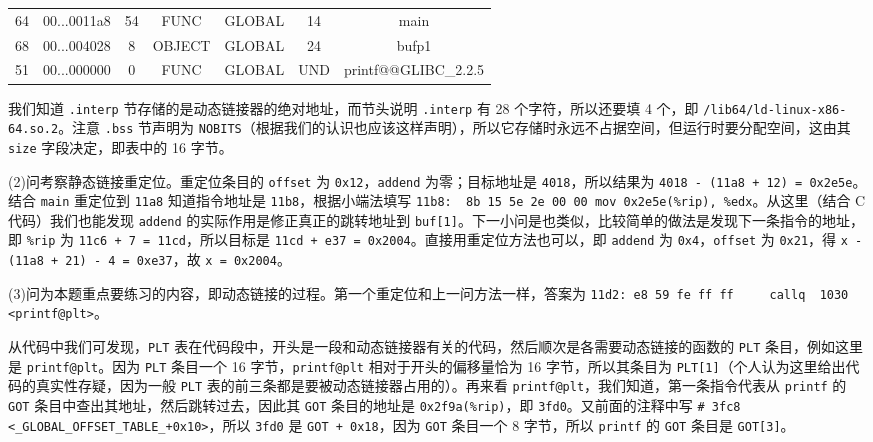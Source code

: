 \begin{problems}
\begin{table}[H]
\begin{tabular}{ccccccc}
                \multicolumn{1}{|c}{64} & 00...0011a8 & 54 & FUNC & GLOBAL & 14 & \multicolumn{1}{c|}{main} \\
                \multicolumn{1}{|c}{68} & 00...004028 & 8 & OBJECT & GLOBAL & 24 & \multicolumn{1}{c|}{bufp1} \\
                \multicolumn{1}{|c}{51} & 00...000000 & 0 & FUNC & GLOBAL & UND & \multicolumn{1}{c|}{printf@@GLIBC\_2.2.5} \\ \hline
            \end{tabular}
        \end{table}

        我们知道 \verb|.interp| 节存储的是动态链接器的绝对地址，而节头说明 \verb|.interp| 有 28 个字符，所以还要填 4 个，即 \verb|/lib64/ld-linux-x86-64.so.2|。注意 \verb|.bss| 节声明为 \verb|NOBITS|（根据我们的认识也应该这样声明），所以它存储时永远不占据空间，但运行时要分配空间，这由其 \verb|size| 字段决定，即表中的 16 字节。

        (2)问考察静态链接重定位。重定位条目的 \verb|offset| 为 \verb|0x12|，\verb|addend| 为零；目标地址是 \verb|4018|，所以结果为 \verb|4018 - (11a8 + 12) = 0x2e5e|。结合 \verb|main| 重定位到 \verb|11a8| 知道指令地址是 \verb|11b8|，根据小端法填写 \verb|11b8:  8b 15 5e 2e 00 00 mov 0x2e5e(%rip), %edx|。从这里（结合 C 代码）我们也能发现 \verb|addend| 的实际作用是修正真正的跳转地址到 \verb|buf[1]|。下一小问是也类似，比较简单的做法是发现下一条指令的地址，即 \verb|%rip| 为 \verb|11c6 + 7 = 11cd|，所以目标是 \verb|11cd + e37 = 0x2004|。直接用重定位方法也可以，即 \verb|addend| 为 \verb|0x4|，\verb|offset| 为 \verb|0x21|，得 \verb|x - (11a8 + 21) - 4 = 0xe37|，故 \verb|x = 0x2004|。

        (3)问为本题重点要练习的内容，即动态链接的过程。第一个重定位和上一问方法一样，答案为 \verb|11d2: e8 59 fe ff ff     callq  1030 <printf@plt>|。
        
        从代码中我们可发现，\verb|PLT| 表在代码段中，开头是一段和动态链接器有关的代码，然后顺次是各需要动态链接的函数的 \verb|PLT| 条目，例如这里是 \verb|printf@plt|。因为 \verb|PLT| 条目一个 16 字节，\verb|printf@plt| 相对于开头的偏移量恰为 16 字节，所以其条目为 \verb|PLT[1]|（个人认为这里给出代码的真实性存疑，因为一般 \verb|PLT| 表的前三条都是要被动态链接器占用的）。再来看 \verb|printf@plt|，我们知道，第一条指令代表从 \verb|printf| 的 \verb|GOT| 条目中查出其地址，然后跳转过去，因此其 \verb|GOT| 条目的地址是 \verb|0x2f9a(%rip)|，即 \verb|3fd0|。又前面的注释中写 \verb|# 3fc8 <_GLOBAL_OFFSET_TABLE_+0x10>|，所以 \verb|3fd0| 是 \verb|GOT + 0x18|，因为 \verb|GOT| 条目一个 8 字节，所以 \verb|printf| 的 \verb|GOT| 条目是 \verb|GOT[3]|。


\end{problems}
